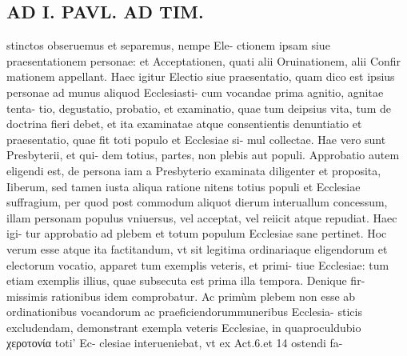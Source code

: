 \documentclass{article}
\begin{document}
\begin{pages}
\section*{AD I. PAVL. AD TIM. }\pstart stinctos obseruemus et separemus, nempe Ele- ctionem ipsam siue praesentationem personae: et Acceptationen, quati alii Oruinationem, alii Confir mationem appellant.  \pend\pstart Haec igitur Electio siue praesentatio, quam dico est ipsius personae ad munus aliquod Ecclesiasti- cum vocandae prima agnitio, agnitae tenta- tio, degustatio, probatio, et examinatio, quae tum deipsius vita, tum de doctrina fieri debet, et ita examinatae atque consentientis denuntiatio et praesentatio, quae fit toti populo et Ecclesiae si- mul collectae. Hae vero sunt Presbyterii, et qui- dem totius, partes, non plebis aut populi.  \pend\pstart Approbatio autem eligendi est, de persona iam a Presbyterio examinata diligenter et proposita, Iiberum, sed tamen iusta aliqua ratione nitens totius populi et Ecclesiae suffragium, per quod post commodum aliquot dierum interuallum concessum, illam personam populus vniuersus, vel acceptat, vel reiicit atque repudiat. Haec igi- tur approbatio ad plebem et totum populum Ecclesiae sane pertinet.  \pend\pstart Hoc verum esse atque ita factitandum, vt sit legitima ordinariaque eligendorum et electorum vocatio, apparet tum exemplis veteris, et primi- tiue Ecclesiae: tum etiam exemplis illius, quae subsecuta est prima illa tempora. Denique fir- missimis rationibus idem comprobatur.  \pend\pstart Ac primùm plebem non esse ab ordinationibus vocandorum ac praeficiendorummuneribus Ecclesia- sticis excludendam, demonstrant exempla veteris Ecclesiae, in quaproculdubio χεροτονία toti' Ec- clesiae interueniebat, vt ex Act.6.et 14 ostendi fa-  \pend

\end{pages}
\end{document}
